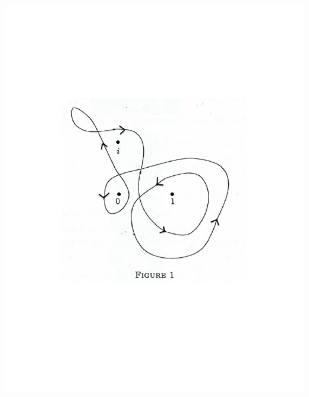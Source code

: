 \documentclass[11pt]{article} %
\theoremstyle{plain}  %
\theoremstyle{definition}  %
\theoremstyle{remark}  %
\begin{document}
\begin{center} 
\includegraphics[scale=0.4]{43funkycurve.pdf}
\end{center}
\end{document}

